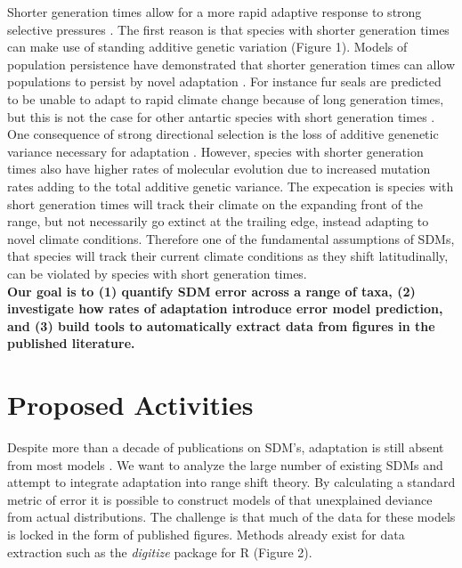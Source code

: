 \documentclass[pdftex,11pt,a4paper]{article}\usepackage{graphicx, color}
\begin{document}
Shorter generation times allow for a more rapid adaptive response to strong selective pressures \citep{Berteaux2004,Somero2010,Hoffmann2011,Reed2011,Shaw2012,Walters2012}.  The first reason is that species with shorter generation times can make use of standing additive genetic variation (Figure 1). Models of population persistence have demonstrated that shorter generation times can allow populations to persist by novel adaptation \citep{Gomulkiewicz1995, Hoffmann2011}. For instance fur seals are predicted to be unable to adapt to rapid climate change because of long generation times, but this is not the case for other antartic species with short generation times \citep{Forcada2008}. One consequence of strong directional selection is the loss of additive genenetic variance necessary for adaptation \citep{Lande1996,Hoffmann2011}.  However, species with shorter generation times also have higher rates of molecular evolution due to increased mutation rates \citep{Thomas2010} adding to the total additive genetic variance.  The expecation is species with short generation times will track their climate on the expanding front of the range, but not necessarily go extinct at the trailing edge, instead adapting to novel climate conditions. Therefore one of the fundamental assumptions of SDMs, that species will track their current climate conditions as they shift latitudinally, can be violated by species with short generation times. \\

\textbf{Our goal is to (1) quantify SDM error across a range of taxa, (2) investigate how rates of adaptation introduce error model prediction, and  (3) build tools to automatically extract data from figures in the published literature.}
\section*{Proposed Activities}

Despite more than a decade of publications on SDM's, adaptation is still absent from most models \citep{Kearney2009}. We want to analyze the large number of existing SDMs and attempt to integrate adaptation into range shift theory. By calculating a standard metric of error it is possible to construct models of that unexplained deviance from actual distributions.  The challenge is that much of the data for these models is locked in the form of published figures.  Methods already exist for data extraction such as the \textit{digitize} package \citep{Poisot2011} for R (Figure 2). 
\end{document}
